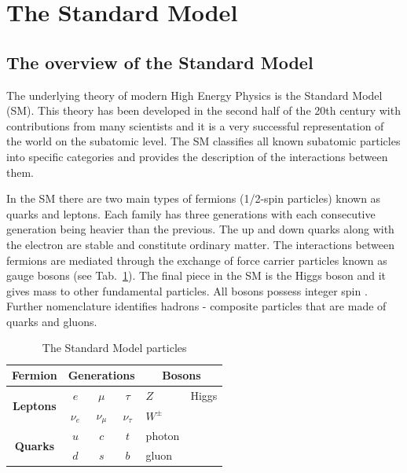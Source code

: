 \section{The Standard Model}
\label{SM}
\subsection{The overview of the Standard Model}
The underlying theory of modern High Energy Physics is the Standard Model (SM). This theory has been developed in the second half of the 20th century with contributions from many scientists and it is a very successful representation of the world on the subatomic level.
The SM classifies all known subatomic particles into specific categories and provides the description of the interactions between them. 

In the SM there are two main types of fermions (1/2-spin particles) known as quarks and leptons. Each family has three generations with each consecutive generation being heavier than the previous. The up and down quarks along with the electron are stable and constitute ordinary matter. The interactions between fermions are mediated through the exchange of force carrier particles known as gauge bosons (see Tab.~\ref{tab:SM}). The final piece in the SM is the Higgs boson and it gives mass to other fundamental particles. All bosons possess integer spin \citep{martin2006nuclear}. Further nomenclature identifies hadrons - composite particles that are made of quarks and gluons. 
\begin{table}[]
\centering
\label{my-label}
\begin{tabular}{cccc | ll}
\textbf{Fermion}                  & \multicolumn{3}{c}{\textbf{Generations}} & \multicolumn{2}{c}{\textbf{Bosons}} \\ \hline
\multirow{2}{*}{\textbf{Leptons}} & $e$        & $\mu$        & $\tau$       & $Z$            & Higgs           \\
                                  & $\nu_{e}$  & $\nu_{\mu}$  & $\nu_{\tau}$ & $W^{\pm}$            &                 \\ 
\multirow{2}{*}{\textbf{Quarks}}  & $u$        & $c$          & $t$          & photon            &                 \\
                                  & $d$        & $s$          & $b$          & gluon             &          \\ \hline      
\end{tabular}
\caption{The Standard Model particles}
\label{tab:SM}
\end{table}

